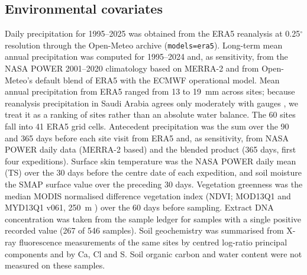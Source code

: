 \documentclass[11pt]{article}
\begin{document}
\subsection*{Environmental covariates}
Daily precipitation for 1995--2025 was obtained from the ERA5 reanalysis \citep{hersbach2020era5} at
0.25$^\circ$ resolution through the Open-Meteo archive (\texttt{models=era5}). Long-term mean annual
precipitation was computed for 1995--2024 and, as sensitivity, from the NASA POWER 2001--2020 climatology
based on MERRA-2 \citep{gelaro2017merra2} and from Open-Meteo's default blend of ERA5 with the ECMWF
operational model. Mean annual precipitation from ERA5 ranged from 13 to 19~mm across sites; because
reanalysis precipitation in Saudi Arabia agrees only moderately with gauges \citep{wang2025sara}, we
treat it as a ranking of sites rather than an absolute water balance. The 60 sites fall into 41 ERA5 grid
cells. Antecedent precipitation was the sum over the 90 and 365 days before each site visit from ERA5 and,
as sensitivity, from NASA POWER daily data (MERRA-2 based) and the blended product (365 days, first four
expeditions). Surface skin temperature was the NASA POWER daily mean (TS) over the 30 days before the
centre date of each expedition, and soil moisture the SMAP surface value over the preceding 30 days. Vegetation greenness was the median MODIS normalised
difference vegetation index (NDVI; MOD13Q1 and MYD13Q1 v061, 250~m \citep{didan2021mod13q1}) over the 60
days before sampling. Extract DNA concentration was taken from the sample ledger for samples with a single
positive recorded value (267 of 546 samples). Soil geochemistry was summarised from X-ray fluorescence
measurements of the same sites by centred log-ratio principal components and by Ca, Cl and S. Soil organic
carbon and water content were not measured on these samples.
\end{document}
